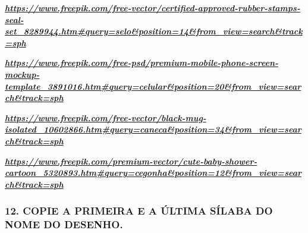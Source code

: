 \href{https://www.freepik.com/free-vector/certified-approved-rubber-stamps-seal-set_8289944.htm\#query=selo\&position=14\&from_view=search\&track=sph}{\textbf{\emph{https://www.freepik.com/free-vector/certified-approved-rubber-stamps-seal-set\_8289944.htm\#query=selo\&position=14\&from\_view=search\&track=sph}}}

\href{https://www.freepik.com/free-psd/premium-mobile-phone-screen-mockup-template_3891016.htm\#query=celular\&position=20\&from_view=search\&track=sph}{\textbf{\emph{https://www.freepik.com/free-psd/premium-mobile-phone-screen-mockup-template\_3891016.htm\#query=celular\&position=20\&from\_view=search\&track=sph}}}

\href{https://www.freepik.com/free-vector/black-mug-isolated_10602866.htm\#query=caneca\&position=34\&from_view=search\&track=sph}{\textbf{\emph{https://www.freepik.com/free-vector/black-mug-isolated\_10602866.htm\#query=caneca\&position=34\&from\_view=search\&track=sph}}}

\href{https://www.freepik.com/premium-vector/cute-baby-shower-cartoon_5320893.htm\#query=cegonha\&position=12\&from_view=search\&track=sph}{\textbf{\emph{https://www.freepik.com/premium-vector/cute-baby-shower-cartoon\_5320893.htm\#query=cegonha\&position=12\&from\_view=search\&track=sph}}}

\subsubsection{12. COPIE A PRIMEIRA E A ÚLTIMA SÍLABA DO NOME DO
DESENHO.}\label{copie-a-primeira-e-a-uxfaltima-suxedlaba-do-nome-do-desenho.}

